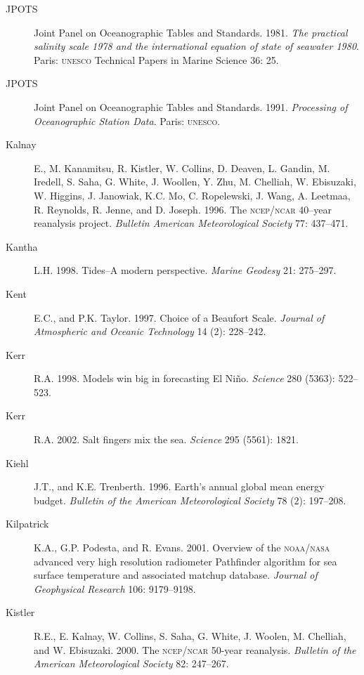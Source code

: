 \begin{description}
\item [JPOTS]Joint Panel on Oceanographic Tables and
  Standards. 1981. \textit{The practical salinity scale 1978 and the
    international equation of state of seawater 1980}. Paris:
  \textsc{unesco} Technical Papers in Marine Science 36: 25.

\item [JPOTS]Joint Panel on Oceanographic Tables and
  Standards. 1991. \textit{Processing of Oceanographic Station
    Data}. Paris: \textsc{unesco}.

\item [Kalnay]E., M. Kanamitsu, R. Kistler, W. Collins, D. Deaven,
  L. Gandin, M. Iredell, S. Saha, G. White, J. Woollen, Y. Zhu,
  M. Chelliah, W. Ebisuzaki, W.  Higgins, J. Janowiak, K.C. Mo,
  C. Ropelewski, J. Wang, A. Leetmaa, R. Reynolds, R. Jenne, and
  D. Joseph. 1996. The \textsc{ncep/ncar} 40--year reanalysis
  project. \textit{Bulletin American Meteorological Society} 77:
  437--471.

\item[Kantha]L.H. 1998. Tides--A modern perspective. \textit{Marine
  Geodesy} 21: 275--297.

\item [Kent]E.C., and P.K. Taylor. 1997. Choice of a Beaufort Scale.
  \textit{Journal of Atmospheric and Oceanic Technology} 14 (2):
  228--242.

\item[Kerr]R.A. 1998. Models win big in forecasting El
  Ni\~{n}o. \textit{Science} 280 (5363): 522--523.

\item [Kerr]R.A. 2002. Salt fingers mix the sea. \textit{Science} 295
  (5561): 1821.

\item [Kiehl]J.T., and K.E. Trenberth. 1996. Earth's annual global
  mean energy budget. \textit{Bulletin of the American Meteorological
    Society} 78 (2): 197--208.

\item [Kilpatrick]K.A., G.P. Podesta, and R. Evans. 2001. Overview of
  the \textsc{noaa/nasa} advanced very high resolution radiometer
  Pathfinder algorithm for sea surface temperature and associated
  matchup database. \textit{Journal of Geophysical Research} 106:
  9179--9198.

\item [Kistler]R.E., E. Kalnay, W. Collins, S. Saha, G. White,
  J. Woolen, M.  Chelliah, and W. Ebisuzaki. 2000. The
  \textsc{ncep/ncar} 50-year reanalysis.  \textit{Bulletin of the
    American Meteorological Society} 82: 247--267.


\end{description}
